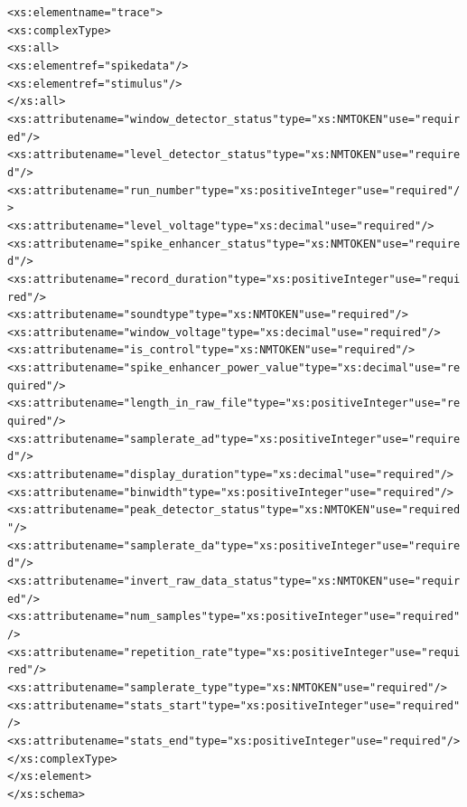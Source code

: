 \documentclass[11pt,letterpaper]{article}
\begin{document}
\begin{footnotesize}
\begin{alltt}
  <xs:element name="trace">
    <xs:complexType>
      <xs:all>
        <xs:element ref="spikedata" />
        <xs:element ref="stimulus" />
      </xs:all>
      <xs:attribute name="window_detector_status" type="xs:NMTOKEN" use="required" />
      <xs:attribute name="level_detector_status" type="xs:NMTOKEN" use="required" />
      <xs:attribute name="run_number" type="xs:positiveInteger" use="required" />
      <xs:attribute name="level_voltage" type="xs:decimal" use="required" />
      <xs:attribute name="spike_enhancer_status" type="xs:NMTOKEN" use="required" />
      <xs:attribute name="record_duration" type="xs:positiveInteger" use="required" />
      <xs:attribute name="soundtype" type="xs:NMTOKEN" use="required" />
      <xs:attribute name="window_voltage" type="xs:decimal" use="required" />
      <xs:attribute name="is_control" type="xs:NMTOKEN" use="required" />
      <xs:attribute name="spike_enhancer_power_value" type="xs:decimal" use="required" />
      <xs:attribute name="length_in_raw_file" type="xs:positiveInteger" use="required" />
      <xs:attribute name="samplerate_ad" type="xs:positiveInteger" use="required" />
      <xs:attribute name="display_duration" type="xs:decimal" use="required" />
      <xs:attribute name="binwidth" type="xs:positiveInteger" use="required" />
      <xs:attribute name="peak_detector_status" type="xs:NMTOKEN" use="required" />
      <xs:attribute name="samplerate_da" type="xs:positiveInteger" use="required" />
      <xs:attribute name="invert_raw_data_status" type="xs:NMTOKEN" use="required" />
      <xs:attribute name="num_samples" type="xs:positiveInteger" use="required" />
      <xs:attribute name="repetition_rate" type="xs:positiveInteger" use="required" />
      <xs:attribute name="samplerate_type" type="xs:NMTOKEN" use="required" />
      <xs:attribute name="stats_start" type="xs:positiveInteger" use="required" />
      <xs:attribute name="stats_end" type="xs:positiveInteger" use="required" />
    </xs:complexType>
  </xs:element>
</xs:schema>
\end{alltt}
\end{footnotesize}
\end{document}

